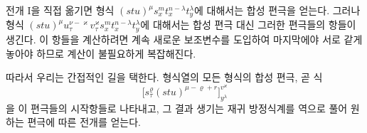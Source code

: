 
전개 I을 직접 옮기면 형식 $(stu)^\mu s_x^m t_x^{n-\lambda}t_y^\lambda$에 대해서는 합성 편극을 얻는다. 그러나 형식 $(stu)^\mu u_\tau^{\nu-\varkappa}v_\tau^\varkappa s_x^m t_x^{n-\lambda}t_y^\lambda$에 대해서는 합성 편극 대신 그러한 편극들의 항들이 생긴다. 이 항들을 계산하려면 계속 새로운 보조변수를 도입하여 마지막에야 서로 같게 놓아야 하므로 계산이 불필요하게 복잡해진다.

따라서 우리는 간접적인 길을 택한다. 형식열의 모든 형식의 합성 편극, 곧 식
\[
\bigl[s_\tau^\varrho(stu)^{\mu-\varrho+r}\bigr]_{y^\lambda}^{v^\varkappa}
\]
을 이 편극들의 시작항들로 나타내고, 그 결과 생기는 재귀 방정식계를 역으로 풀어 원하는 편극에 따른 전개를 얻는다.

